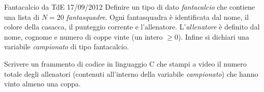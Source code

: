 \documentclass[aspectratio=169, handout]{beamer}
\begin{document}
\begin{frame}{Fantacalcio da TdE 17/09/2012}
Definire un tipo di dato \emph{fantacalcio} che contiene una lista di $N = 20$ \emph{fantasquadre}. Ogni fantasquadra è identificata dal nome, il colore della casacca, il punteggio corrente e l’allenatore. L’\emph{allenatore} è definito dal nome, cognome e numero di coppe vinte (un intero $\geq 0$). Infine si dichiari una variabile \emph{campionato} di
tipo fantacalcio.

Scrivere un frammento di codice in linguaggio C che stampi a video il numero totale degli allenatori (contenuti all'interno della variabile \emph{campionato}) che hanno vinto almeno una coppa.
\end{frame}
\end{document}
